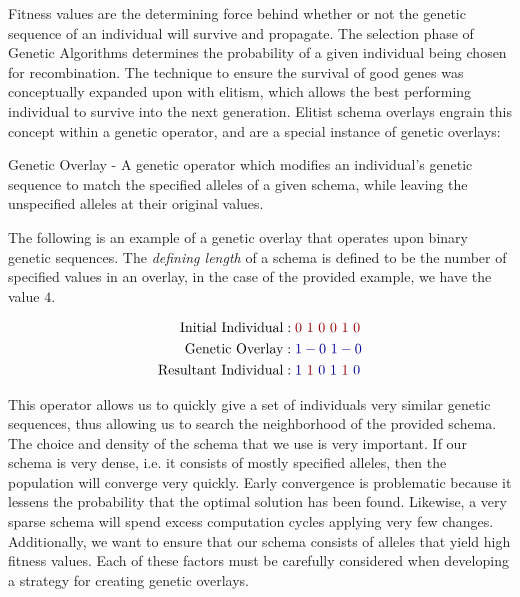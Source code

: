 Fitness values are the determining force behind whether or not the genetic sequence of an individual will survive and propagate. The selection phase of Genetic Algorithms determines the probability of a given individual being chosen for recombination. The technique to ensure the survival of good genes was conceptually expanded upon with elitism, which allows the best performing individual to survive into the next generation. Elitist schema overlays engrain this concept within a genetic operator, and are a special instance of genetic overlays:

\begin{overlay}
Genetic Overlay - A genetic operator which modifies an individual's genetic sequence to match the specified alleles of a given schema, while leaving the unspecified alleles at their original values. 
\end{overlay}

The following is an example of a genetic overlay that operates upon binary genetic sequences. The \emph{defining length} of a schema is defined to be the number of specified values in an overlay, in the case of the provided example, we have the value $4$.

\begin{figure}[h!]
\centering 
\begin{align*}
\text{Initial Individual} &: {\color{myred}0~1~0~0~1~0} 		\\
\text{Genetic Overlay} &: {\color{myblue}1-0~1-0}				\\
\text{Resultant Individual} &: {\color{myblue}1}~{\color{myred}1}~{\color{myblue}0~1}~{\color{myred}1}~{\color{myblue}0}			
\end{align*}
\end{figure}


This operator allows us to quickly give a set of individuals very similar genetic sequences, thus allowing us to search the neighborhood of the provided schema. The choice and density of the schema that we use is very important. If our schema is very dense, i.e. it consists of mostly specified alleles, then the population will converge very quickly. Early convergence is problematic because it lessens the probability that the optimal solution has been found\cite{Deb99}. Likewise, a very sparse schema will spend excess computation cycles applying very few changes. Additionally, we want to ensure that our schema consists of alleles that yield high fitness values. Each of these factors must be carefully considered when developing a strategy for creating genetic overlays. 

